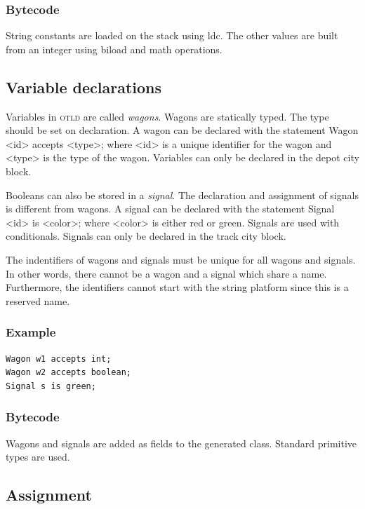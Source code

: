 \documentclass[10pt,a4paper]{article}
\newcommand{\code}[1]{{\ttfamily\small #1}}
\newcommand{\shortname}{\textsc{otld} }
\begin{document}
\subsubsection*{Bytecode}

String constants are loaded on the stack using \code{ldc}. The other values are built from an integer using \code{biload} and math operations.

\subsection{Variable declarations}

Variables in \shortname are called \emph{wagons}. Wagons are statically typed. The type should be set on declaration.
A wagon can be declared with the statement \code{Wagon <id> accepts <type>;} where \code{<id>} is a unique identifier for the wagon and \code{<type>} is the type of the wagon. Variables can only be declared in the \code{depot} city block.

Booleans can also be stored in a \emph{signal}. The declaration and assignment of signals is different from wagons. A signal can be declared with the statement \code{Signal <id> is <color>;} where \code{<color>} is either \code{red} or \code{green}. Signals are used with conditionals. Signals can only be declared in the \code{track} city block.

The indentifiers of wagons and signals must be unique for all wagons and signals. In other words, there cannot be a wagon and a signal which share a name. Furthermore, the identifiers cannot start with the string \code{platform} since this is a reserved name.

\subsubsection*{Example}

\begin{lstlisting}
Wagon w1 accepts int;
Wagon w2 accepts boolean;
Signal s is green;
\end{lstlisting}

\subsubsection*{Bytecode}

Wagons and signals are added as fields to the generated class. Standard primitive types are used.

\subsection{Assignment}
\end{document}
